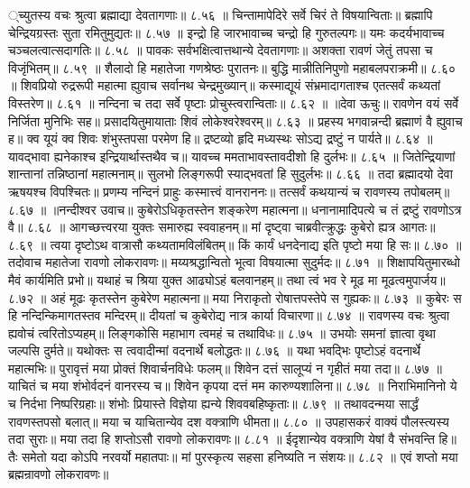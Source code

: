 ्च्युतस्य वचः श्रुत्वा ब्रह्माद्या देवतागणाः॥ ८.५६ ॥
चिन्तामापेदिरे सर्वे चिरं ते विषयान्विताः॥
ब्रह्मापि चेन्द्रियग्रस्तः सुता रमितुमुद्यतः॥ ८.५७ ॥
इन्द्रो हि जारभावाच्च चन्द्रो हि गुरुतल्पगः॥
यमः कदर्यभावाच्च चञ्चलत्वात्सदागतिः॥ ८.५८ ॥
पावकः सर्वभक्षित्वात्तथान्ये देवतागणाः॥
अशक्ता रावणं जेतुं तपसा च विजृंभितम्॥ ८.५९ ॥
शैलादो हि महातेजा गणश्रेष्ठः पुरातनः॥
बुद्धि मान्नीतिनिपुणो महाबलपराक्रमी॥ ८.६० ॥
शिवप्रियो रुद्ररूपी महात्मा ह्युवाच सर्वानथ चेन्द्रमुख्यान्॥
कस्माद्यूयं संभ्रमादागताश्च एतत्सर्वं कथ्यतां विस्तरेण॥ ८.६१ ॥
नन्दिना च तदा सर्वे पृष्टाः प्रोचुस्त्वरान्विताः॥ ८.६२ ॥
॥देवा ऊचुः॥
रावणेन वयं सर्वे निर्जिता मुनिभिः सह॥
प्रसादयितुमायाताः शिवं लोकेश्वरेश्वरम्॥ ८.६३ ॥
प्रहस्य भगवान्नन्दी ब्रह्माणं वै ह्युवाच ह॥
क्व यूयं क्व शिवः शंभुस्तपसा परमेण हि॥
द्रष्टव्यो हृदि मध्यस्थः सोऽद्य द्रष्टुं न पार्यते॥ ८.६४ ॥
यावद्भावा ह्यनेकाश्च इन्द्रियार्थास्तथैव च॥
यावच्च ममताभावस्तावदीशो हि दुर्लभः॥ ८.६५ ॥
जितेन्द्रियाणां शान्तानां तन्निष्ठानां महात्मनाम्॥
सुलभो लिङ्गरूपी स्याद्भवतां हि सुदुर्लभः॥ ८.६६ ॥
तदा ब्रह्मादयो देवा ऋषयश्च विपश्चितः॥
प्रणम्य नन्दिनं प्राहुः कस्मात्त्वं वानराननः॥
तत्सर्वं कथयान्यं च रावणस्य तपोबलम्॥ ८.६७ ॥
॥नन्दीश्वर उवाच॥
कुबेरोऽधिकृतस्तेन शङ्करेण महात्मना॥
धनानामादिपत्ये च तं द्रष्टुं रावणोऽत्र वै॥ ८.६८ ॥
आगच्छत्त्वरया युक्तः समारुह्य स्ववाहनम्॥
मां दृष्ट्वा चाब्रवीत्क्रुद्धः कुबेरो ह्यत्र आगतः॥ ८.६९ ॥
त्वया दृष्टोऽथ वात्रासौ कथ्यतामविलंबितम्॥
किं कार्यं धनदेनाद्य इति पृष्टो मया हि सः॥ ८.७० ॥
तदोवाच महातेजा रावणो लोकरावणः॥
मय्यश्रद्धान्वितो भूत्वा विषयात्मा सुदुर्मदः॥ ८.७१ ॥
शिक्षापयितुमारब्धो मैवं कार्यमिति प्रभो॥
यथाहं च श्रिया युक्त आढ्योऽहं बलवानहम्॥
तथा त्वं भव रे मूढ मा मूढत्वमुपार्जय॥ ८.७२ ॥
अहं मूढः कृतस्तेन कुबेरेण महात्मना॥
मया निराकृतो रोषात्तपस्तेपे स गुह्यकः॥ ८.७३ ॥
कुबेरः स हि नन्दिन्किमागतस्तव मन्दिरम्॥
दीयतां च कुबेरोद्य नात्र कार्या विचारणा॥ ८.७४ ॥
रावणस्य वचः श्रुत्वा ह्यवोचं त्वरितोऽप्यहम्॥
लिङ्गकोसि महाभाग त्वमहं च तथाविधः॥ ८.७५ ॥
उभयोः समनां ज्ञात्वा वृथा जल्पसि दुर्मते॥
यथोक्तः स त्ववादीन्मां वदनार्थे बलोद्धतः॥ ८.७६ ॥
यथा भवद्भिः पृष्टोऽहं वदनार्थे महात्मभिः॥
पुरावृत्तं मया प्रोक्तं शिवार्चनविधेः फलम्॥
शिवेन दत्तं सालूप्यं न गृहीतं मया तदा॥ ८.७७ ॥
याचितं च मया शंभोर्वदनं वानरस्य च॥
शिवेन कृपया दत्तं मम कारुण्यशालिना॥ ८.७८ ॥
निराभिमानिनो ये च निर्दभा निष्परिग्रहाः॥
शंभोः प्रियास्ते विज्ञेया ह्यन्ये शिववबहिष्कृताः॥ ८.७९ ॥
तथावदन्मया सार्द्धं रावणस्तपसो बलात्॥
मया च याचितान्येव दश वक्त्राणि धीमता॥ ८.८० ॥
उपहासकरं वाक्यं पौलस्त्यस्य तदा सुराः॥
मया तदा हि शप्तोऽसौ रावणो लोकरावणः॥ ८.८१ ॥
ईदृशान्येव वक्त्राणि येषां वै संभवन्ति हि॥
तैः समेतो यदा कोऽपि नरवर्यो महातपाः॥
मां पुरस्कृत्य सहसा हनिष्यति न संशयः॥ ८.८२ ॥
एवं शप्तो मया ब्रह्मन्रावणो लोकरावणः॥
